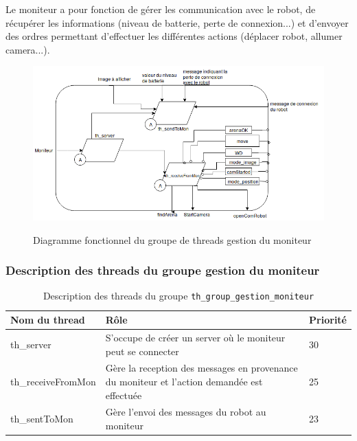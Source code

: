 \documentclass[11pt, a4paper]{paper}
\begin{document}
{Le moniteur a pour fonction de gérer les communication avec le robot, de récupérer les informations (niveau de batterie, perte de connexion...) et d'envoyer des ordres permettant d'effectuer les différentes actions (déplacer robot, allumer camera...).}

\begin{figure}[htbp]
\label{fig:diag_fonc_moniteur}
\begin{center}
{\includegraphics[scale=.4]{./dossier_conception/diag_fonc_moniteur}}
{\caption{Diagramme fonctionnel du groupe de threads gestion du moniteur}}
\end{center}
\end{figure}
\FloatBarrier

\subsubsection{Description des threads  du groupe gestion du moniteur}

\begin{table}[htp]
\caption{Description des threads du groupe {\tt th\_group\_gestion\_moniteur}}
\begin{center}
\begin{tabular}{|p{4cm}|p{7.5cm}|p{2cm}|}
\hline
\bf Nom du thread &	\bf Rôle &	\bf Priorité \\
\hline
\hline
\color{blue}th\_server	& \color{blue}S'occupe de créer un server où le moniteur peut se connecter & \color{blue}30\\
\hline
\color{blue}th\_receiveFromMon &	\color{blue}Gère la reception des messages en provenance du moniteur et l'action demandée est effectuée &	\color{blue}25\\
\hline
\color{blue}th\_sentToMon	& \color{blue}Gère l'envoi des messages du robot au moniteur & \color{blue}23\\
\hline
\end{tabular}
\end{center}
\label{tab:gt_moniteur}
\end{table}%
\end{document}
